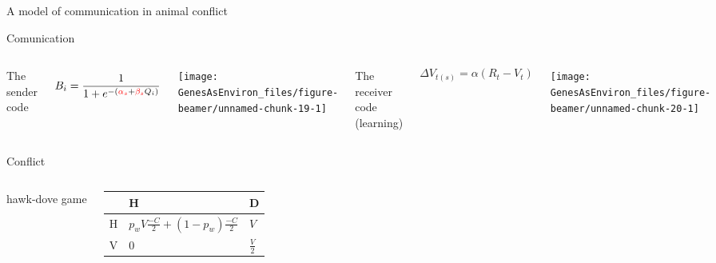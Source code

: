 \documentclass[
  ignorenonframetext,
]{beamer}
\begin{document}
\begin{frame}{A model of communication in animal conflict}
\protect\hypertarget{a-model-of-communication-in-animal-conflict}{}

\vspace{-0.5cm}

\begin{block}{Comunication}

\begin{columns}[T]


The sender code

\tiny
\begin{equation*}
B_i = \frac{1}{1+e^{-(\textcolor{red}{\alpha_s} +\textcolor{red}{\beta_s} Q_i)}}
\end{equation*}



\begin{center}\texttt{[image: GenesAsEnviron\_files/figure-beamer/unnamed-chunk-19-1]} \end{center}



The receiver code (learning)

\tiny
\begin{equation*}
  \Delta V_{t(s)}=\alpha (R_t-V_t)
\end{equation*}



\begin{center}\texttt{[image: GenesAsEnviron\_files/figure-beamer/unnamed-chunk-20-1]} \end{center}

\end{columns}

\end{block}

\begin{block}{Conflict}

\vspace{0.3cm}
\begin{columns}
hawk-dove game
\tiny
\begin{center}
\begin{tabular}{ >{\centering\arraybackslash}p{0.2cm} | >{\centering\arraybackslash}p{2.5cm} | >{\centering\arraybackslash}p{0.8cm} }
& H & D \\ \hline
H & $p_w V\frac{-C}{2} + (1-p_w) \frac{-C}{2}$ & $V$ \\ \hline
V & $0$ & $\frac{V}{2}$\\
\end{tabular}
\end{center}


\end{columns}
\end{block}
\end{frame}
\end{document}
